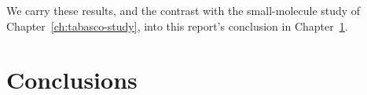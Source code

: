 \documentclass[12pt,a4paper,twoside]{report}
\begin{document}
We carry these results, and the contrast with the small-molecule study of Chapter~\ref{ch:tabasco-study}, into this report's conclusion in Chapter~\ref{ch:conclusions}.

\chapter{Conclusions}
\label{ch:conclusions}

%
%
\end{document}
